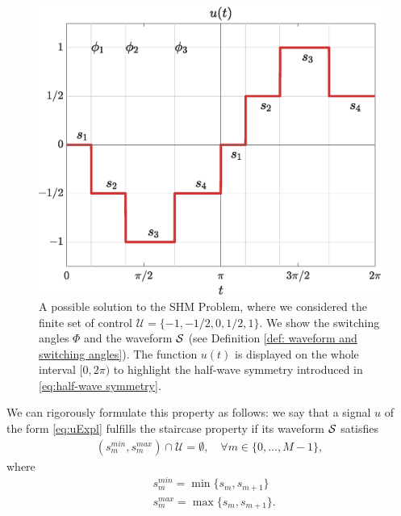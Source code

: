 \documentclass[twocolumn]{autart}    %
\begin{document}
\begin{figure}[h]
	\centering
	\includegraphics[scale=0.35]{img/fig01.eps} 
	\caption{A possible solution to the SHM Problem, where we considered the finite set of control $\mathcal{U} = \{-1, -1/2, 0, 1/2, 1\}$. We show the switching angles $\Phi$ and the waveform $\mathcal{S}$ (see Definition \ref{def: waveform and switching angles}). The function $u(t)$ is displayed on the whole interval $[0,2\pi)$ to highlight the half-wave symmetry introduced in \eqref{eq:half-wave symmetry}.}
	\label{fig:exampleSHE}
\end{figure}

We can rigorously formulate this property as follows: we say that a signal $u$ of the form \eqref{eq:uExpl} fulfills the staircase property if its waveform $\mathcal{S}$ satisfies
\JOStart
\begin{gather}\label{eq:staircase prop}
	(s_m^{min},s_{m}^{max}) \cap \mathcal{U} = \emptyset, \quad \forall m\in \{ 0, \ldots, M-1 \},
\end{gather}
where 
\begin{align*}
	&s^{min}_m = \min\{s_m,s_{m+1}\} 
	\\[5pt]
	&s^{max}_m = \max\{s_m,s_{m+1}\}.
\end{align*}
\JOEnd
\end{document}
